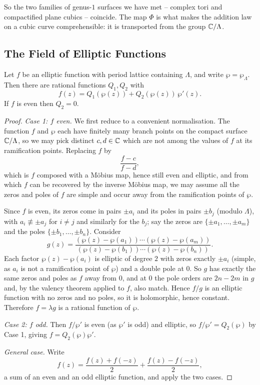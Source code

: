 \documentclass[a4paper]{scrartcl}
\begin{document}
So the two families of genus-$1$ surfaces we have met -- complex tori and compactified
plane cubics -- coincide. The map $\Phi$ is what makes the addition law on a cubic curve
comprehensible: it is transported from the group $\mathbb{C}/\Lambda$.

\subsection{The Field of Elliptic Functions}

\begin{theorem}\label{thm:ellipticfield}
	Let $f$ be an elliptic function with period lattice containing $\Lambda$, and write
	$\wp = \wp_\Lambda$. Then there are rational functions $Q_1, Q_2$ with
	$$
	f(z) = Q_1(\wp(z)) + Q_2(\wp(z))\,\wp'(z).
	$$
	If $f$ is even then $Q_2 = 0$.
\end{theorem}

\begin{proof}
	\emph{Case 1: $f$ even.} We first reduce to a convenient normalisation. The function $f$
	and $\wp$ each have finitely many branch points on the compact surface $\mathbb{C}/\Lambda$, so
	we may pick distinct $c, d\in\mathbb{C}$ which are not among the values of $f$ at its
	ramification points. Replacing $f$ by
	$$
	\frac{f - c}{f - d},
	$$
	which is $f$ composed with a M\"obius map, hence still even and elliptic, and from which
	$f$ can be recovered by the inverse M\"obius map, we may assume all the zeros and poles
	of $f$ are simple and occur away from the ramification points of $\wp$.

	Since $f$ is even, its zeros come in pairs $\pm a_i$ and its poles in pairs $\pm b_j$
	(modulo $\Lambda$), with $a_i \not\equiv \pm a_j$ for $i \neq j$ and similarly for the
	$b_j$; say the zeros are $\{\pm a_1,\dots,\pm a_m\}$ and the poles
	$\{\pm b_1,\dots,\pm b_n\}$. Consider
	$$
	g(z) = \frac{(\wp(z)-\wp(a_1))\cdots(\wp(z)-\wp(a_m))}{(\wp(z)-\wp(b_1))\cdots(\wp(z)-\wp(b_n))}.
	$$
	Each factor $\wp(z)-\wp(a_i)$ is elliptic of degree $2$ with zeros exactly $\pm a_i$
	(simple, as $a_i$ is not a ramification point of $\wp$) and a double pole at $0$. So $g$
	has exactly the same zeros and poles as $f$ away from $0$, and at $0$ the pole orders are
	$2n - 2m$ in $g$ and, by the valency theorem applied to $f$, also match. Hence $f/g$ is
	an elliptic function with no zeros and no poles, so it is holomorphic, hence constant.
	Therefore $f = \lambda g$ is a rational function of $\wp$.

	\emph{Case 2: $f$ odd.} Then $f/\wp'$ is even (as $\wp'$ is odd) and elliptic, so
	$f/\wp' = Q_2(\wp)$ by Case 1, giving $f = Q_2(\wp)\wp'$.

	\emph{General case.} Write
	$$
	f(z) = \frac{f(z)+f(-z)}{2} + \frac{f(z)-f(-z)}{2},
	$$
	a sum of an even and an odd elliptic function, and apply the two cases.
\end{proof}
\end{document}
